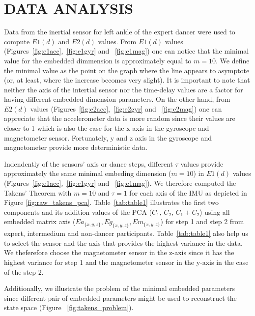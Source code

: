 \documentclass{sigchi}
\begin{document}
\section{DATA ANALYSIS}
Data from the inertial sensor for left ankle of the expert dancer were used
to compute $E1(d)$ and $E2(d)$ values. From $E1(d)$ values 
(Figures~\ref{fig:e1acc},~\ref{fig:e1gyr} and ~\ref{fig:e1mag})
one can notice that the minimal value for the embedded dimmension is approximately
equal to $m=10$. We define the minimal value as the point on the graph where the 
line appears to asymptote (or, at least, where the increase becomes very slight). 
It is important to note that neither the axis of the intertial sensor 
nor the time-delay values are a factor for having different embedded dimension parameters.
On the other hand, from $E2(d)$ values (Figures~\ref{fig:e2acc},~\ref{fig:e2gyr} and ~\ref{fig:e2mag})
one can appreciate that the accelerometer data is more random since their values are closer to 1
which is also the case for the x-axis in the gyroscope and magnetometer sensor. 
Fortunately, y and z axis in the gyroscope and magnetometer provide more deterministic data.

Indendently of the sensors' axis or dance steps, different $\tau$ values provide approximately the 
same minimal embeding dimension ($m=10$) in $E1(d)$ values (Figures~\ref{fig:e1acc},~\ref{fig:e1gyr} and ~\ref{fig:e1mag}).
We therefore computed the Takens' Theorem 
with $m=10$ and $\tau = 1$ for each axis of the IMU as depicted in Figure \ref{fig:raw_takens_pca}.
Table~\ref{tab:table1} illustrates the first two components and its addition values of the PCA ($C_1$, $C_2$, $C_1+ C_2$)
using all embedded matrix axis ($Ea_{ \{ x,y,z \} },Eg_{\{ x,y,z \}},Em_{\{ x,y,z \}}$) for step 1 and step 2 from expert, 
intermedium and non-dancer participants.
Table~\ref{tab:table1} also help us to select the sensor and the axis that 
provides the highest variance in the data.
We theferefore choose the magnetometer sensor in the z-axis since it has the highest variance for step 1
and the magnetometer sensor in the y-axis in the case of the step 2.

Additionally, we illustrate the problem of the minimal embedded parameters since 
different pair of embedded parameters might be used to reconstruct the state space (Figure ~\ref{fig:takens_problem}). 
\end{document}
